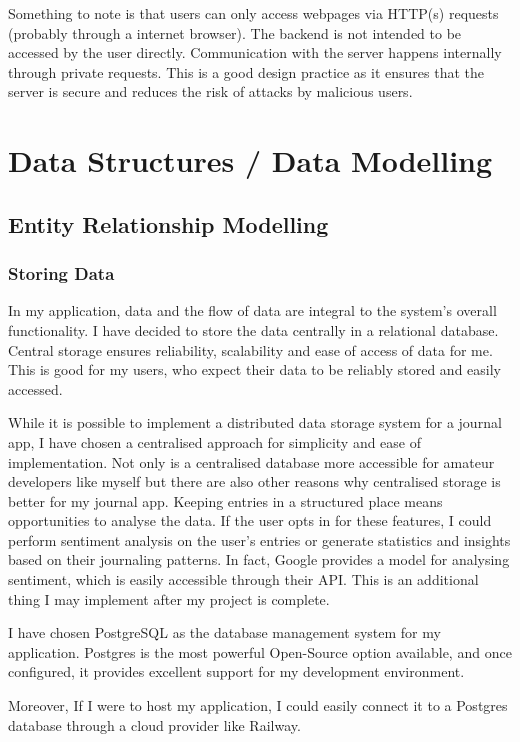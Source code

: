 Something to note is that users can only access webpages via HTTP(s) requests (probably through a internet browser). The backend is not intended to be accessed by the user directly. Communication with the server happens internally through private requests. This is a good design practice as it ensures that the server is secure and reduces the risk of attacks by malicious users. 


\section{Data Structures / Data Modelling}
\subsection{Entity Relationship Modelling}
\subsubsection{Storing Data}
In my application, data and the flow of data are integral to the system's overall functionality. I have decided to store the data centrally in a relational database. Central storage ensures reliability, scalability and ease of access of data for me. This is good for my users, who expect their data to be reliably stored and easily accessed.

While it is possible to implement a distributed data storage system for a journal app, I have chosen a centralised approach for simplicity and ease of implementation. Not only is a centralised database more accessible for amateur developers like myself but there are also other reasons why centralised storage is better for my journal app. Keeping entries in a structured place means opportunities to analyse the data. If the user opts in for these features, I could perform sentiment analysis on the user's entries or generate statistics and insights based on their journaling patterns. In fact, Google provides a model for analysing sentiment, which is easily accessible through their API. This is an additional thing I may implement after my project is complete.

I have chosen PostgreSQL as the database management system for my application. Postgres is the most powerful Open-Source option available, and once configured, it provides excellent support for my development environment.

Moreover, If I were to host my application, I could easily connect it to a Postgres database through a cloud provider like Railway.

